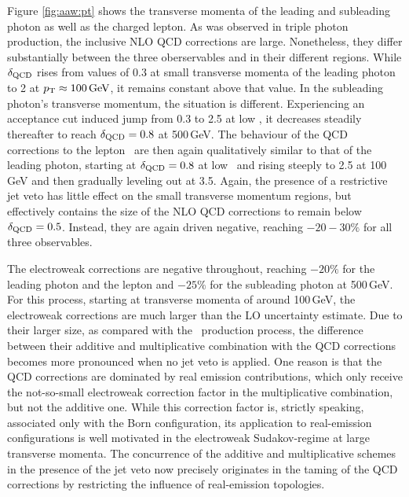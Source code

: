 Figure \ref{fig:aaw:pt} shows the transverse momenta of 
the leading and subleading photon as well as the charged 
lepton. 
As was observed in triple photon production, the inclusive 
NLO QCD corrections are large. 
Nonetheless, they differ substantially between the three 
oberservables and in their different regions. 
While $\delta_\text{QCD}$ rises from values of 0.3 at small 
transverse momenta of the leading photon to 2 at 
$p_\text{T}\approx 100\,\text{GeV}$, it remains constant above that 
value.
In the subleading photon's transverse momentum, the 
situation is different. 
Experiencing an acceptance cut induced jump from 0.3 to 2.5 at low \pT, 
it decreases steadily thereafter to reach $\delta_\text{QCD}=0.8$ 
at 500\,GeV. 
The behaviour of the QCD corrections to the lepton \pT\ are 
then again qualitatively similar to that of the leading 
photon, starting at $\delta_\text{QCD}=0.8$ at low \pT \, and rising 
steeply to 2.5 at 100\,GeV and then gradually leveling out 
at 3.5. 
Again, the presence of a restrictive jet veto has little 
effect on the small transverse momentum regions, but 
effectively contains the size of the NLO QCD corrections 
to remain below $\delta_\text{QCD}=0.5$. 
Instead, they are again driven negative, reaching 
$-20-30\%$ for all three observables. 

The electroweak corrections are negative throughout, 
reaching $-20\%$ for the leading photon and the lepton 
and $-25\%$ for the subleading photon at 500\,GeV. 
For this process, starting at transverse momenta of 
around 100\,GeV, the electroweak corrections are much 
larger than the LO uncertainty estimate.
Due to their larger size, as compared with the \aaa\ 
production process, the difference between their 
additive and multiplicative combination with the 
QCD corrections becomes more pronounced when no 
jet veto is applied. 
One reason is that the QCD corrections are dominated 
by real emission contributions, which only receive the 
not-so-small electroweak correction factor in the 
multiplicative combination, but not the additive one. 
While this correction factor is, strictly speaking, 
associated only with the Born configuration, its 
application to real-emission configurations is well 
motivated in the electroweak Sudakov-regime at 
large transverse momenta. 
The concurrence of the additive and multiplicative 
schemes in the presence of the jet veto now precisely 
originates in the taming of the QCD corrections by 
restricting the influence of real-emission topologies. 

